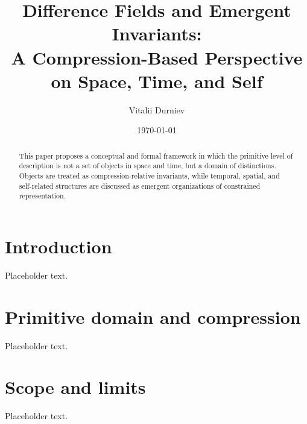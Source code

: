 \documentclass[11pt]{article}
\title{Difference Fields and Emergent Invariants:\\A Compression-Based Perspective on Space, Time, and Self}
\author{Vitalii Durniev}
\date{\today}
\begin{document}
\maketitle

\begin{abstract}
This paper proposes a conceptual and formal framework in which the primitive level of
description is not a set of objects in space and time, but a domain of distinctions.
Objects are treated as compression-relative invariants, while temporal, spatial, and
self-related structures are discussed as emergent organizations of constrained representation.
\end{abstract}

\section{Introduction}
Placeholder text.

\section{Primitive domain and compression}
Placeholder text.

\section{Scope and limits}
Placeholder text.



\end{document}
